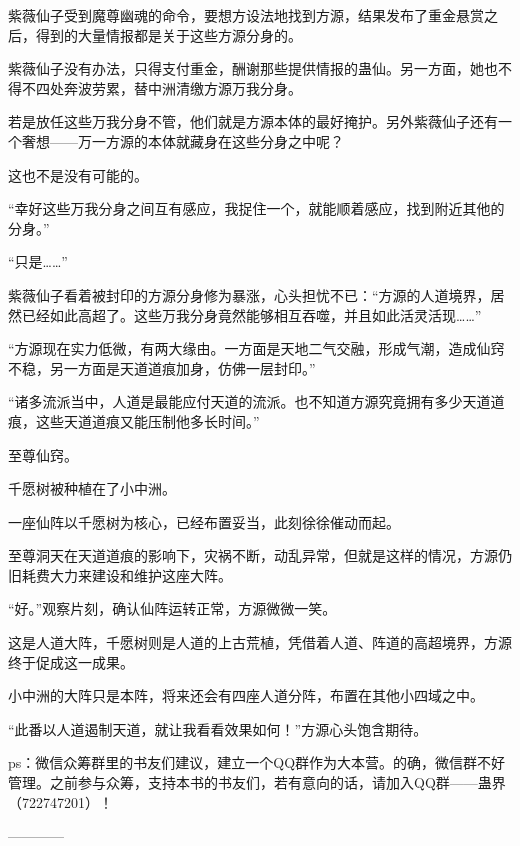 \begin{this_body}
紫薇仙子受到魔尊幽魂的命令，要想方设法地找到方源，结果发布了重金悬赏之后，得到的大量情报都是关于这些方源分身的。

紫薇仙子没有办法，只得支付重金，酬谢那些提供情报的蛊仙。另一方面，她也不得不四处奔波劳累，替中洲清缴方源万我分身。

若是放任这些万我分身不管，他们就是方源本体的最好掩护。另外紫薇仙子还有一个奢想——万一方源的本体就藏身在这些分身之中呢？

这也不是没有可能的。

“幸好这些万我分身之间互有感应，我捉住一个，就能顺着感应，找到附近其他的分身。”

“只是……”

紫薇仙子看着被封印的方源分身修为暴涨，心头担忧不已：“方源的人道境界，居然已经如此高超了。这些万我分身竟然能够相互吞噬，并且如此活灵活现……”

“方源现在实力低微，有两大缘由。一方面是天地二气交融，形成气潮，造成仙窍不稳，另一方面是天道道痕加身，仿佛一层封印。”

“诸多流派当中，人道是最能应付天道的流派。也不知道方源究竟拥有多少天道道痕，这些天道道痕又能压制他多长时间。”

至尊仙窍。

千愿树被种植在了小中洲。

一座仙阵以千愿树为核心，已经布置妥当，此刻徐徐催动而起。

至尊洞天在天道道痕的影响下，灾祸不断，动乱异常，但就是这样的情况，方源仍旧耗费大力来建设和维护这座大阵。

“好。”观察片刻，确认仙阵运转正常，方源微微一笑。

这是人道大阵，千愿树则是人道的上古荒植，凭借着人道、阵道的高超境界，方源终于促成这一成果。

小中洲的大阵只是本阵，将来还会有四座人道分阵，布置在其他小四域之中。

“此番以人道遏制天道，就让我看看效果如何！”方源心头饱含期待。

ps：微信众筹群里的书友们建议，建立一个QQ群作为大本营。的确，微信群不好管理。之前参与众筹，支持本书的书友们，若有意向的话，请加入QQ群——蛊界（722747201）！

------------

\end{this_body}

